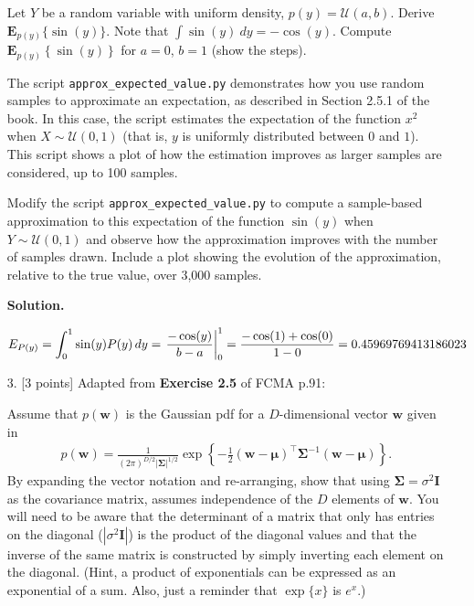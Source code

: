 \documentclass[10pt]{article}
\begin{document}
\begin{itemize}
Let $Y$ be a random variable with uniform density, $p(y) = \mathcal{U}(a,b)$.  Derive $\mathbf{E}_{p(y)} \{ \sin(y) \}$.  Note that $\int \sin(y)~dy = - \cos(y)$.  Compute $\mathbf{E}_{p(y)} \left\{ \sin(y) \right\}$ for $a=0$, $b=1$ (show the steps).  

The script {\tt approx\_expected\_value.py} demonstrates how you use random samples to approximate an expectation, as described in Section 2.5.1 of the book.  In this case, the script estimates the expectation of the function $x^2$ when $X \sim \mathcal{U}(0,1)$ (that is, $y$ is uniformly distributed between $0$ and $1$).  This script shows a plot of how the estimation improves as larger samples are considered, up to 100 samples.

Modify the script {\tt approx\_expected\_value.py} to compute a sample-based approximation to this expectation of the function $\sin(y)$ when $Y \sim \mathcal{U}(0,1)$ and observe how the approximation improves with the number of samples drawn.  Include a plot showing the evolution of the approximation, relative to the true value, over 3,000 samples.

{\bf Solution.}


\[E_{P(y)} = \int_0^1 \sin(y) P(y) \, dy = \left. {{-\cos(y)} \over {b - a}} \right |_0^1 =  {{-\cos(1)+\cos(0)} \over {1 - 0} } =  0.45969769413186023\]


\item[3.] [3 points]
Adapted from {\bf Exercise 2.5} of FCMA p.91:

Assume that $p(\mathbf{w})$ is the Gaussian pdf for a $D$-dimensional vector $\mathbf{w}$ given in
\begin{eqnarray*}
p(\mathbf{w}) = \frac{1}{(2 \pi)^{D/2} | \mathbf{\Sigma} |^{1/2}} \exp \left\{ -\frac{1}{2} (\mathbf{w} - \mathbf{\mu})^\top \mathbf{\Sigma}^{-1} (\mathbf{w} - \mathbf{\mu}) \right\} .
\end{eqnarray*}
By expanding the vector notation and re-arranging, show that using $\mathbf{\Sigma} = \sigma^2 \mathbf{I}$ as the covariance matrix, assumes independence of the $D$ elements of $\mathbf{w}$.  You will need to be aware that the determinant of a matrix that only has entries on the diagonal ($|\sigma^2 \mathbf{I}|$) is the product of the diagonal values and that the inverse of the same matrix is constructed by simply inverting each element on the diagonal.  (Hint, a product of exponentials can be expressed as an exponential of a sum.  Also, just a reminder that $\exp\{x\}$ is $e^x$.)


\end{itemize}
\end{document}
